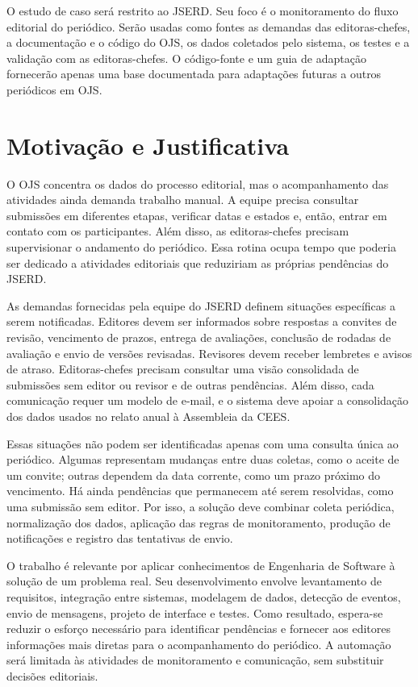 O estudo de caso será restrito ao JSERD. Seu foco é o monitoramento do fluxo editorial do periódico. Serão usadas como fontes as demandas das editoras-chefes, a documentação e o código do OJS, os dados coletados pelo sistema, os testes e a validação com as editoras-chefes. O código-fonte e um guia de adaptação fornecerão apenas uma base documentada para adaptações futuras a outros periódicos em OJS.

\section{Motivação e Justificativa}
\label{sec-intro-motjus}

O OJS concentra os dados do processo editorial, mas o acompanhamento das atividades ainda demanda trabalho manual. A equipe precisa consultar submissões em diferentes etapas, verificar datas e estados e, então, entrar em contato com os participantes. Além disso, as editoras-chefes precisam supervisionar o andamento do periódico. Essa rotina ocupa tempo que poderia ser dedicado a atividades editoriais que reduziriam as próprias pendências do JSERD.

As demandas fornecidas pela equipe do JSERD definem situações específicas a serem notificadas. Editores devem ser informados sobre respostas a convites de revisão, vencimento de prazos, entrega de avaliações, conclusão de rodadas de avaliação e envio de versões revisadas. Revisores devem receber lembretes e avisos de atraso. Editoras-chefes precisam consultar uma visão consolidada de submissões sem editor ou revisor e de outras pendências. Além disso, cada comunicação requer um modelo de e-mail, e o sistema deve apoiar a consolidação dos dados usados no relato anual à Assembleia da CEES.

Essas situações não podem ser identificadas apenas com uma consulta única ao periódico. Algumas representam mudanças entre duas coletas, como o aceite de um convite; outras dependem da data corrente, como um prazo próximo do vencimento. Há ainda pendências que permanecem até serem resolvidas, como uma submissão sem editor. Por isso, a solução deve combinar coleta periódica, normalização dos dados, aplicação das regras de monitoramento, produção de notificações e registro das tentativas de envio.

O trabalho é relevante por aplicar conhecimentos de Engenharia de Software à solução de um problema real. Seu desenvolvimento envolve levantamento de requisitos, integração entre sistemas, modelagem de dados, detecção de eventos, envio de mensagens, projeto de interface e testes. Como resultado, espera-se reduzir o esforço necessário para identificar pendências e fornecer aos editores informações mais diretas para o acompanhamento do periódico. A automação será limitada às atividades de monitoramento e comunicação, sem substituir decisões editoriais.

